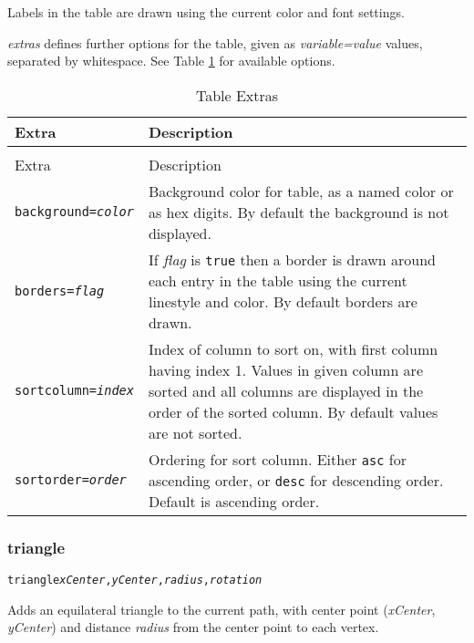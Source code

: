 Labels in the table are drawn using the current color and font settings.

\textit{extras} defines further options for the table, given as
\textit{variable=value} values, separated by whitespace.
See Table \ref{tableextras}
for available options.

\begin{longtable}{|l|p{7cm}|}
\hline
\label{tableextras}
Extra & Description \\
\hline
\hline
\endfirsthead
\hline
\caption{Table Extras} \\
\endfoot

\hline
Extra & Description \\
\hline
\hline
\endhead

\texttt{background=\textit{color}} &

Background color for table, as a named color or as hex digits.
By default the background is not displayed. \\

\texttt{borders=\textit{flag}} &

If \textit{flag} is \texttt{true} then a border is drawn around
each entry in the table using the current linestyle and color.
By default borders are drawn. \\

\texttt{sortcolumn=\textit{index}} &

Index of column to sort on, with first column having index 1.
Values in given column are sorted and all columns are displayed
in the order of the sorted column.
By default values are not sorted. \\

\texttt{sortorder=\textit{order}} &

Ordering for sort column.  Either \texttt{asc} for ascending
order, or \texttt{desc} for descending order.  Default is ascending order. \\

\hline
\end{longtable}


\subsubsection{triangle}

\begin{alltt}
triangle \textit{xCenter}, \textit{yCenter}, \textit{radius}, \textit{rotation}
\end{alltt}

Adds an equilateral triangle to the current path, with center
point (\textit{xCenter}, \textit{yCenter}) and distance
\textit{radius}
from the center point to each vertex.

